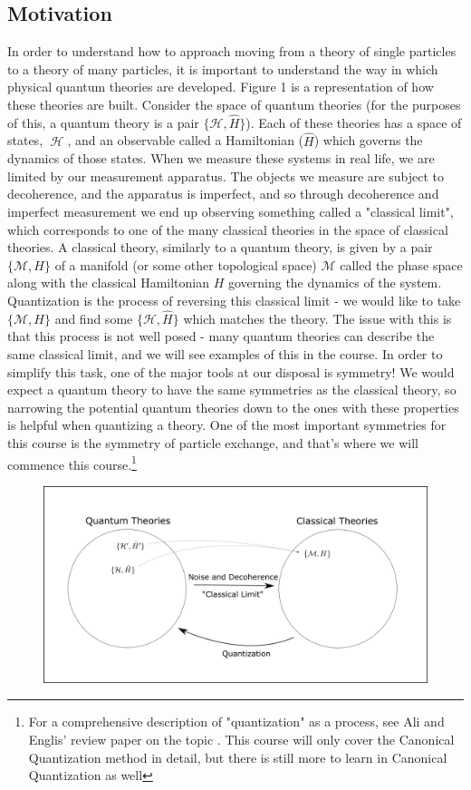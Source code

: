 \documentclass{article}
\DeclareMathOperator{\Hh}{{\mathcal{H}}}
\begin{document}
\subsection{Motivation}
In order to understand how to approach moving from a theory of single particles to a theory of many particles, it is important to understand the way in which physical quantum theories are developed. Figure 1 is a representation of how these theories are built. Consider the space of quantum theories (for the purposes of this, a quantum theory is a pair $\{\mathcal{H},\hat H\}$). Each of these theories has a space of states, $\Hh$, and an observable called a Hamiltonian ($\hat H$) which governs the dynamics of those states. When we measure these systems in real life, we are limited by our measurement apparatus. The objects we measure are subject to decoherence, and the apparatus is imperfect, and so through decoherence and imperfect measurement we end up observing something called a "classical limit", which corresponds to one of the many classical theories in the space of classical theories. A classical theory, similarly to a quantum theory, is given by a pair $\{\mathcal{M},H\}$ of a manifold (or some other topological space) $\mathcal{M}$ called the phase space along with the classical Hamiltonian $H$ governing the dynamics of the system. Quantization is the process of reversing this classical limit - we would like to take $\{\mathcal{M},H\}$ and find some $\{\mathcal{H},\hat H\}$ which matches the theory. The issue with this is that this process is not well posed - many quantum theories can describe the same classical limit, and we will see examples of this in the course. In order to simplify this task, one of the major tools at our disposal is symmetry! We would expect a quantum theory to have the same symmetries as the classical theory, so narrowing the potential quantum theories down to the ones with these properties is helpful when quantizing a theory. One of the most important symmetries for this course is the symmetry of particle exchange, and that's where we will commence this course.\footnote{For a comprehensive description of "quantization" as a process, see Ali and Englis' review paper on the topic \cite{ali2005quantization}. This course will only cover the Canonical Quantization method in detail, but there is still more to learn in Canonical Quantization as well}
\begin{figure}[ht]
    \centering
    \includegraphics[width=\linewidth]{Figures/fig1.png}
    \caption*{}
    \label{fig:fig11}
\end{figure}
\pagebreak
\end{document}
